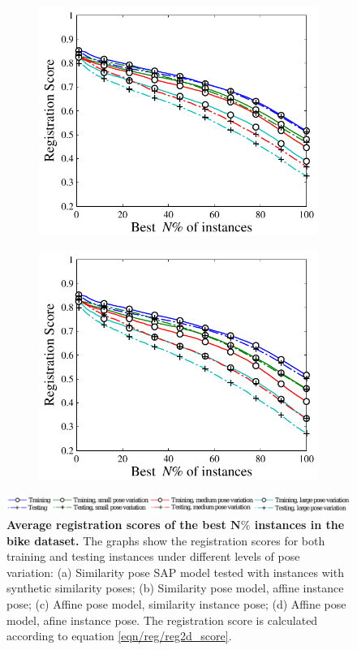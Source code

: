 \begin{figure}[ht]
\begin{subfigure}[b]{0.48\linewidth}
		\includegraphics[width=\linewidth]{fig/reg/reg2d_affsim.pdf}
	\end{subfigure}
	\begin{subfigure}[b]{0.48\linewidth}
		\includegraphics[width=\linewidth]{fig/reg/reg2d_affaff.pdf}
	\end{subfigure}
	\includegraphics[width=1\linewidth]{fig/reg/reg2d_legend.pdf}
	\caption{\textbf{Average registration scores of the best $\mathbf{N\%}$ instances in the \textbf{bike} dataset.} The graphs show the registration scores for both training and testing instances under different levels of pose variation: (a) Similarity pose SAP model tested with instances with synthetic similarity poses; (b) Similarity pose model, affine instance pose; (c) Affine pose model, similarity instance pose; (d) Affine pose model, afine instance pose. The registration score is calculated according to equation \ref{eqn/reg/reg2d_score}.} 
	\label{fig/reg/regresult2d}
\end{figure}

